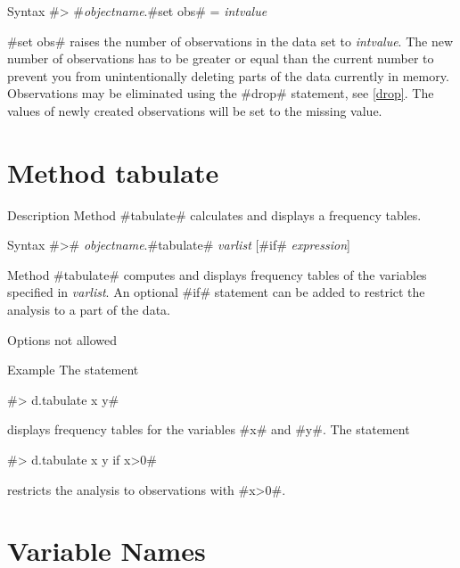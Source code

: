 \begin{stanza}{Syntax}
#> #{\em objectname}.#set obs# = {\em intvalue}

#set obs# raises the number of observations in the data set to {\em intvalue}. The new number of observations has to be greater or equal than the current number to prevent you from unintentionally deleting parts of the data currently in memory. Observations may be eliminated using the #drop# statement, see \autoref{drop}. The values of newly created observations will be set to the missing value.
\end{stanza}


\section{Method tabulate}
 \label{tabulate} 

\begin{stanza}{Description}
Method #tabulate# calculates and displays a frequency tables.
\end{stanza}

\begin{stanza}{Syntax}
#># {\em objectname}.#tabulate# {\em varlist} [#if# {\em expression}]

Method #tabulate# computes and displays frequency tables of the variables specified in {\em varlist}. An optional #if# statement can be added to restrict the analysis to a part of the data.
\end{stanza}

\begin{stanza}{Options}
not allowed
\end{stanza}

\begin{stanza}{Example}
The statement

#> d.tabulate x y#

displays frequency tables for the variables #x# and #y#. The statement

#> d.tabulate x y if x>0#

restricts the analysis to observations with #x>0#.
\end{stanza}


\section{Variable Names}
 \label{varnames} 

